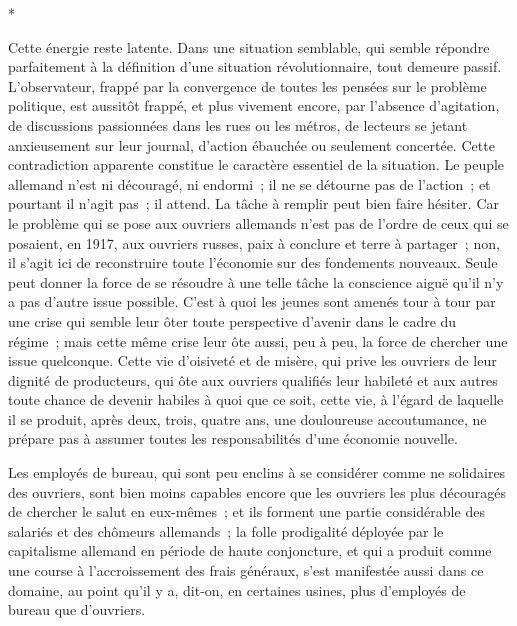 \documentclass[french,twoside]{book} %
\begin{document}
\begin{center}
*\end{center}
\noindent Cette énergie reste latente. Dans une situation semblable, qui semble répondre parfaitement à la définition d'une situation révolutionnaire, tout demeure passif. L'observateur, frappé par la convergence de toutes les pensées sur le problème politique, est aussitôt frappé, et plus vivement encore, par l'absence d'agitation, de discussions passionnées dans les rues ou les métros, de lecteurs se jetant anxieusement sur leur journal, d'action ébauchée ou seulement concertée. Cette contradiction apparente constitue le caractère essentiel de la situation. Le peuple allemand n'est ni découragé, ni endormi ; il ne se détourne pas de l'action ; et pourtant il n'agit pas ; il attend. La tâche à remplir peut bien faire hésiter. Car le problème qui se pose aux ouvriers allemands n'est pas de l'ordre de ceux qui se posaient, en 1917, aux ouvriers russes, paix à conclure et terre à partager ; non, il s'agit ici de reconstruire toute l'économie sur des fondements nouveaux. Seule peut donner la force de se résoudre à une telle tâche la conscience aiguë qu'il n'y a pas d'autre issue possible. C'est à quoi les jeunes sont amenés tour à tour par une crise qui semble leur ôter toute perspective d'avenir dans le cadre du régime ; mais cette même crise leur ôte aussi, peu à peu, la force de chercher une issue quelcon­que. Cette vie d'oisiveté et de misère, qui prive les ouvriers de leur dignité de producteurs, qui ôte aux ouvriers qualifiés leur habileté et aux autres toute chance de devenir habiles à quoi que ce soit, cette vie, à l'égard de laquelle il se produit, après deux, trois, quatre ans, une douloureuse accoutumance, ne prépare pas à assumer toutes les responsabilités d'une économie nouvelle.\par
Les employés de bureau, qui sont peu enclins à se considérer comme ne solidaires des ouvriers, sont bien moins capables encore que les ouvriers les plus découragés de chercher le salut en eux-mêmes ; et ils forment une partie considérable des salariés et des chômeurs allemands ; la folle prodigalité déployée par le capitalisme allemand en période de haute conjoncture, et qui a produit comme une course à l'accroissement des frais généraux, s'est manifes­tée aussi dans ce domaine, au point qu'il y a, dit-on, en certaines usines, plus d'employés de bureau que d'ouvriers.\par
\end{document}
